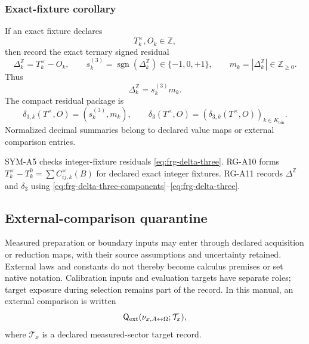 \subsubsection{Exact-fixture corollary}\label{subsec:frg-delta-three-corollary}
If an exact fixture declares
\[
T_k^\times,O_k\in\mathbb Z,
\]
then record the exact ternary signed residual
\begin{equation}
\Delta_k^{\mathbb Z}=T_k^\times-O_k,
\qquad
s_k^{(3)}=\operatorname{sgn}(\Delta_k^{\mathbb Z})\in\{-1,0,+1\},
\qquad
m_k=|\Delta_k^{\mathbb Z}|\in\mathbb Z_{\ge0}.
\label{eq:frg-delta-three-components}
\end{equation}
Thus
\begin{equation}
\Delta_k^{\mathbb Z}=s_k^{(3)}m_k.
\label{eq:frg-delta-three-signed-product}
\end{equation}
The compact residual package is
\begin{equation*}
\delta_{3,k}(T^\times,O)=(s_k^{(3)},m_k),
\qquad
\delta_3(T^\times,O)
=
\left(\delta_{3,k}(T^\times,O)\right)_{k\in K_{\mathrm{bin}}}.
\tag{RG10}\label{eq:frg-delta-three}
\end{equation*}
Normalized decimal summaries belong to declared value maps or external comparison entries.

SYM-A5 checks integer-fixture residuals \eqref{eq:frg-delta-three}.
RG-A10 forms \(T_k^\times-T_k^0=\sum C_{ij,k}^{\times}(B)\) for
declared exact integer fixtures. RG-A11 records \(\Delta^{\mathbb Z}\) and
\(\delta_3\) using \eqref{eq:frg-delta-three-components}--\eqref{eq:frg-delta-three}.



\subsection{External-comparison quarantine}\label{manual:external-comparison-quarantine}
Measured preparation or boundary inputs may enter through declared acquisition
or reduction maps, with their source assumptions and uncertainty retained.
External laws and constants do not thereby become calculus premises or set
native notation. Calibration inputs and evaluation targets have separate
roles; target exposure during selection remains part of the record. In this manual, an external comparison is written
\[
\mathsf{Q}_{\mathrm{ext}}(\nu_{x,A{\leftrightarrow}\Omega};\mathcal T_x),
\]
where \(\mathcal T_x\) is a declared measured-sector target record.


